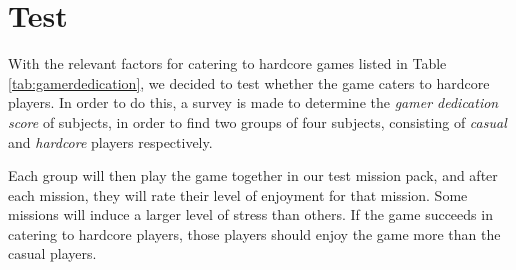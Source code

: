 \chapter{Test}
With the relevant factors for catering to hardcore games listed in Table \ref{tab:gamerdedication}, we decided to test whether the game caters to hardcore players.
In order to do this, a survey is made to determine the \emph{gamer dedication score} of subjects, in order to find two groups of four subjects, consisting of \emph{casual} and \emph{hardcore} players respectively.

Each group will then play the game together in our test mission pack, and after each mission, they will rate their level of enjoyment for that mission.
Some missions will induce a larger level of stress than others.
If the game succeeds in catering to hardcore players, those players should enjoy the game more than the casual players.